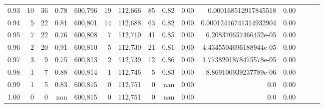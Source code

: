 \begin{tabular}{rrrrrrrrrrrrrrr}
0.93 &      10 &     36 &  0.78 &  600,796 &       19 &  112,666 &       85 &  0.82 &  0.00 &    0.000168512917845518 &      0.00 \\
0.94 &       5 &     22 &  0.81 &  600,801 &       14 &  112,688 &       63 &  0.82 &  0.00 &  0.00012416741314932904 &      0.00 \\
0.95 &       7 &     22 &  0.76 &  600,808 &        7 &  112,710 &       41 &  0.85 &  0.00 &   6.208370657466452e-05 &      0.00 \\
0.96 &       2 &     20 &  0.91 &  600,810 &        5 &  112,730 &       21 &  0.81 &  0.00 &  4.4345504696188944e-05 &      0.00 \\
0.97 &       3 &      9 &  0.75 &  600,813 &        2 &  112,739 &       12 &  0.86 &  0.00 &  1.7738201878475578e-05 &      0.00 \\
0.98 &       1 &      7 &  0.88 &  600,814 &        1 &  112,746 &        5 &  0.83 &  0.00 &   8.869100939237789e-06 &      0.00 \\
0.99 &       1 &      5 &  0.83 &  600,815 &        0 &  112,751 &        0 &   nan &  0.00 &                     0.0 &      0.00 \\
1.00 &       0 &      0 &   nan &  600,815 &        0 &  112,751 &        0 &   nan &  0.00 &                     0.0 &      0.00 \\
\bottomrule
\end{tabular}
